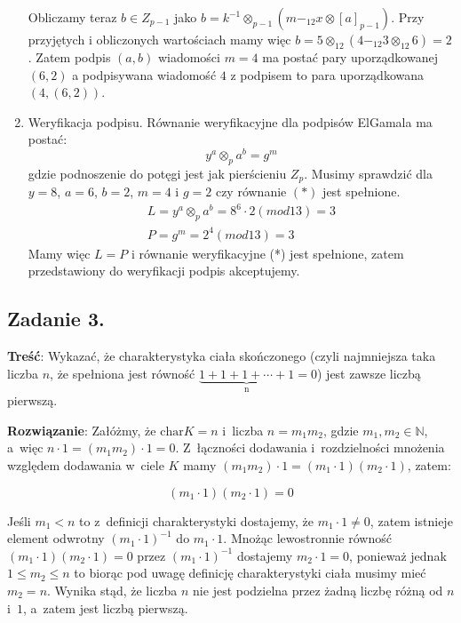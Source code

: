 \documentclass[a4paper,10pt, twocolumn]{article}
\begin{document}
\begin{enumerate}
 Obliczamy teraz $b \in Z_{p-1}$ jako $b=k^{-1}\otimes_{p-1}(m-_{12}x\otimes[a]_{p-1})$. Przy przyjętych i obliczonych wartościach mamy więc $b=5\otimes_{12}(4-_{12}3\otimes_{12}6)=2$. Zatem podpis $(a,b)$ wiadomości $m=4$ ma postać pary uporządkowanej $(6,2)$ a podpisywana wiadomość $4$ z podpisem to para uporządkowana $(4,(6,2))$.
 \item Weryfikacja podpisu. Równanie weryfikacyjne dla podpisów ElGamala ma postać: 
 \begin{equation*}
  y^a\otimes_p a^b=g^m
 \end{equation*}
 gdzie podnoszenie do potęgi jest jak pierścieniu $Z_p$. Musimy sprawdzić dla $y=8$, $a=6$, $b=2$, $m=4$ i $g=2$ czy równanie $(*)$ jest spełnione.
 \begin{equation*}
  \begin{array}{c}L=y^a\otimes_p a^b=8^6\cdot2(mod13)=3 \\ P=g^m=2^4(mod13)=3\end{array}
 \end{equation*}
 Mamy więc $L=P$ i równanie weryfikacyjne (*) jest spełnione, zatem przedstawiony do weryfikacji podpis akceptujemy.
\end{enumerate}

\subsection{Zadanie 3.}

\textbf{Treść}: Wykazać, że charakterystyka ciała skończonego (czyli najmniejsza taka liczba $n$, że spełniona jest równość $\underbrace{1 + 1 + 1 + \cdots + 1}_\text{n} = 0$) jest zawsze liczbą pierwszą.

\textbf{Rozwiązanie}: Załóżmy, że $\text{char} K = n$ i~liczba $n = m_{1}m_{2}$, gdzie $m_{1}, m_{2} \in \mathbb{N}$, a~więc $n \cdot 1 = (m_{1}m_{2}) \cdot 1 = 0$. Z~łączności dodawania i~rozdzielności mnożenia względem dodawania w~ciele $K$ mamy $(m_{1}m_{2}) \cdot 1 = (m_{1} \cdot 1)(m_{2} \cdot 1)$, zatem:

\begin{equation*}
(m_{1} \cdot 1)(m_{2} \cdot 1) = 0
\end{equation*}

Jeśli $m_{1} < n$ to z~definicji charakterystyki dostajemy, że $m_{1} \cdot 1 \neq 0$, zatem istnieje element odwrotny $(m_{1} \cdot 1)^{-1}$ do $m_{1} \cdot 1$. Mnożąc lewostronnie równość $(m_{1} \cdot 1)(m_{2} \cdot 1) = 0$ przez $(m_{1} \cdot 1)^{-1}$ dostajemy $m_{2} \cdot 1 = 0$, ponieważ jednak $1 \leq m_{2} \leq n$ to biorąc pod uwagę definicję charakterystyki ciała musimy mieć $m_{2} = n$. Wynika stąd, że liczba $n$ nie jest podzielna przez żadną liczbę różną od $n$ i~$1$, a~zatem jest liczbą pierwszą.
\end{document}
